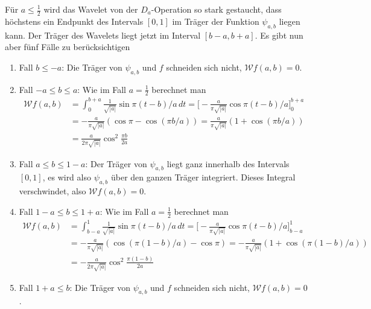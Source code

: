 \begin{loesung}
\begin{teilaufgaben}
\begin{figure}
{\label{04001:wavelet2}}
\end{figure}
\item
Für $a\le\frac12$ wird das Wavelet von der $D_a$-Operation so stark gestaucht,
dass höchstens ein Endpunkt des Intervals $[0,1]$ im Träger der Funktion
$\psi_{a,b}$ liegen kann.
Der Träger des Wavelets liegt jetzt im Interval $[b-a,b+a]$.
Es gibt nun aber fünf Fälle zu berücksichtigen
\begin{enumerate}
\item Fall $b\le -a$:
Die Träger von $\psi_{a,b}$ und $f$ schneiden
sich nicht, $\mathcal{W}f(a,b)=0$.
\item Fall $-a\le b \le a$:
Wie im Fall $a=\frac12$ berechnet man
\begin{align*}
\mathcal{W}f(a,b)
&=
\int_{0}^{b+a} \frac{1}{\sqrt{|a|}} \sin \pi(t-b)/a\,dt
=
\biggl[
-
\frac{a}{\pi\sqrt{|a|}}
\cos \pi(t-b)/a
\biggr]_0^{b+a}
\\
&=
-\frac{a}{\pi\sqrt{|a|}}(\cos\pi - \cos(\pi b/a))
=
\frac{a}{\pi\sqrt{|a|}}(1+\cos(\pi b/a))
\\
&=
\frac{a}{2\pi\sqrt{|a|}}\cos^2\frac{\pi b}{2a}
\end{align*}
\item Fall $a\le b \le 1-a$:
Der Träger von $\psi_{a,b}$ liegt ganz innerhalb des Intervals $[0,1]$,
es wird also $\psi_{a,b}$ über den ganzen Träger integriert.
Dieses Integral verschwindet, also 
$\mathcal{W}f(a,b)=0$.
\item Fall $1-a\le b \le 1 +a$:
Wie im Fall $a=\frac12$ berechnet man
\begin{align*}
\mathcal{W}f(a,b)
&=
\int_{b-a}^{1} \frac{1}{\sqrt{|a|}} \sin \pi(t-b)/a\,dt
=
\biggl[
-
\frac{a}{\pi\sqrt{|a|}}
\cos \pi(t-b)/a
\biggr]_{b-a}^1
\\
&=
-\frac{a}{\pi\sqrt{|a|}}(
\cos(\pi (1-b)/a)
-
\cos\pi 
)
=
-\frac{a}{\pi\sqrt{|a|}}(1+\cos(\pi(1- b)/a))
\\
&=
-\frac{a}{2\pi\sqrt{|a|}}\cos^2\frac{\pi(1- b)}{2a}
\end{align*}
\item Fall $1+a\le b$:
Die Träger von $\psi_{a,b}$ und $f$ schneiden
sich nicht, $\mathcal{W}f(a,b)=0$.
\end{enumerate}
\item
\end{teilaufgaben}
\end{loesung}
